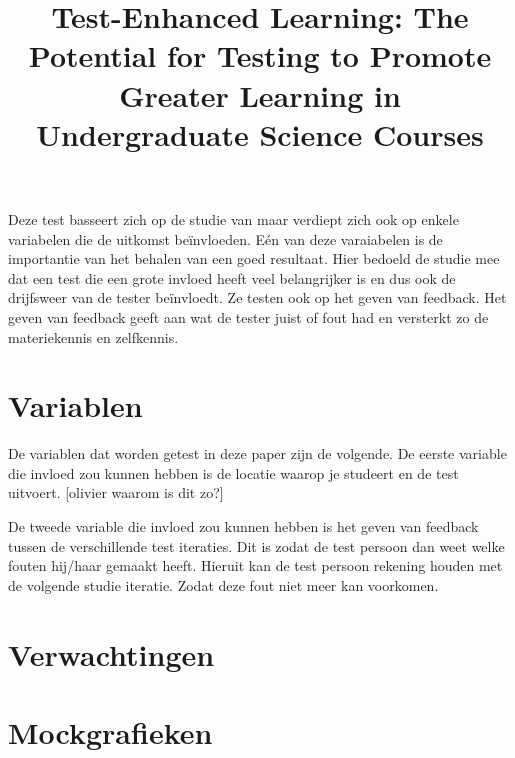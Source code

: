 \documentclass{hogent-article}
\begin{document}
    \title{Test-Enhanced Learning: The Potential for Testing to Promote Greater Learning in Undergraduate Science Courses}
    Deze test basseert zich op de studie van \autocite{brame2015test} maar verdiept zich ook op enkele variabelen die de uitkomst beïnvloeden. Eén van deze varaiabelen is de importantie van het behalen van een goed resultaat. Hier bedoeld de studie mee dat een test die een grote invloed heeft veel belangrijker is en dus ook de drijfsweer van de tester beïnvloedt.
    Ze testen ook op het geven van feedback. Het geven van feedback geeft aan wat de tester juist of fout had en versterkt zo de materiekennis en zelfkennis.
	
	\section{Variablen}
	De variablen dat worden getest in deze paper zijn de volgende.
	De eerste variable die invloed zou kunnen hebben is de locatie waarop je studeert en de test uitvoert.
	[olivier waarom is dit zo?]
	
	De tweede variable die invloed zou kunnen hebben is het geven van feedback tussen de verschillende test iteraties. 
	Dit is zodat de test persoon dan weet welke fouten hij/haar gemaakt heeft. Hieruit kan de test persoon rekening houden met de volgende studie iteratie. Zodat deze fout niet meer kan voorkomen. 
	
	
	\section{Verwachtingen}
	
	
	\section{Mockgrafieken}
	
	\printbibliography[heading=bibintoc]
	
\end{document}
